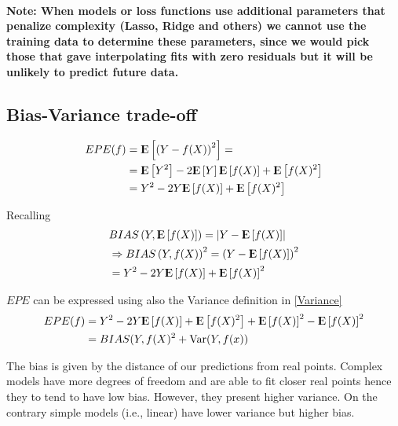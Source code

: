 \documentclass[12pt, letterpaper]{article}
\theoremstyle{definition}
\newcommand{\E}{{\rm I\kern-.3em E}}
\newcommand{\Var}{\mathrm{Var}}
\begin{document}
\paragraph{\textbf{Note}: When models or loss functions use additional parameters that penalize complexity (Lasso, Ridge and others) we cannot use the training data to determine these parameters, since we would pick those that gave interpolating fits with zero residuals but it will be unlikely to predict future data.}

\subsection{Bias-Variance trade-off}
\begin{equation}
\begin{aligned}
EPE(f) &= \E \left[ \left( Y- f(X) \right)^2 \right] =\\
            &= \E \left[ Y^2\right] - 2 \E \left[ Y\right] \E\left[ f(X)\right] + \E\left[ f(X)^2\right]\\
             &= Y^2 - 2  Y \E\left[ f(X)\right] + \E\left[ f(X)^2\right]
\end{aligned}
\end{equation}

Recalling 
\begin{equation}
\begin{aligned}
&BIAS\left(Y,\E\left[f(X)\right]\right) = \left| Y-\E\left[f(X)\right]\right| \\
&\Rightarrow BIAS\left(Y,f(X)\right)^2 = \left( Y-\E\left[f(X)\right]\right)^2 \\
&= Y^2 -2 Y \E\left[f(X)\right] + \E\left[f(X)\right]^2 \\
\end{aligned}
\end{equation}

$EPE$ can be expressed using also the Variance definition in \ref{Variance}
\begin{equation}
\begin{aligned}
\label{biasVar}
EPE(f) &=  Y^2 - 2  Y \E\left[ f(X)\right] + \E\left[ f(X)^2\right] +\E\left[f(X)\right]^2-\E\left[f(X)\right]^2\\
&= BIAS(Y, f(X)^2 + \Var(Y, f(x))
\end{aligned}
\end{equation}

The bias is given by the distance of our predictions from real points. Complex models have more degrees of freedom and are able to fit closer real points hence they to tend to have low bias. However, they present higher variance. On the contrary simple models (i.e., linear) have lower variance but higher bias.
\end{document}
